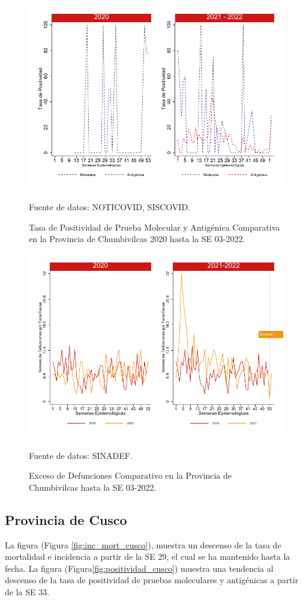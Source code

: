 \documentclass[12pt,a4paper,openany]{book}
\begin{document}
		\begin{figure}[h]
			\caption{Tasa de Positividad de Prueba Molecular y Antigénica Comparativa en la Provincia de Chumbivilcas 2020 hasta la SE 03-2022.}\label{fig:positividad_chumbivilcas}
			\begin{center}
				\includegraphics[width=0.7\linewidth]{../figuras/positividad_20_21_6}
			\end{center}
			{\footnotesize {Fuente de datos: NOTICOVID, SISCOVID.}}
		\end{figure}
		
		\begin{figure}[h]
			\caption{Exceso de Defunciones Comparativo en la Provincia de Chumbivilcas hasta la SE 03-2022.}\label{fig:exceso_chumbivilcas}
			\begin{center}
				\includegraphics[width=0.7\linewidth]{../figuras/exceso_6}
			\end{center}
			{\footnotesize {Fuente de datos: SINADEF.}}
		\end{figure}
		
		\clearpage
		
		\subsection*{Provincia de Cusco}
		\noindent La figura (Figura \ref{fig:inc_mort_cusco}),  muestra un descenso de la tasa de mortalidad e incidencia a partir de la SE 29, el cual se ha mantenido hasta la fecha. 
		\noindent La figura (Figura\ref{fig:positividad_cusco}) muestra una tendencia al descenso de la tasa de positividad de pruebas moleculares y antigénicas a partir de la SE 33.
	
\end{document}

